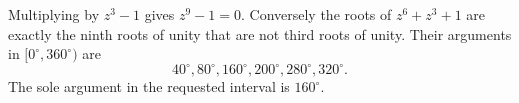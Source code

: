 Multiplying by $z^3-1$ gives $z^9-1=0$. Conversely the roots of $z^6+z^3+1$ are exactly the ninth roots of unity that are not third roots of unity. Their arguments in $[0^\circ,360^\circ)$ are
\[
40^\circ,80^\circ,160^\circ,200^\circ,280^\circ,320^\circ.
\]
The sole argument in the requested interval is $\boxed{160^\circ}$.
